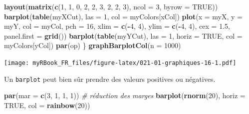 \documentclass[
]{book}
\newenvironment{Shaded}{\begin{snugshade}}{\end{snugshade}}
\newcommand{\CommentTok}[1]{\textcolor[rgb]{0.56,0.35,0.01}{\textit{#1}}}
\newcommand{\DataTypeTok}[1]{\textcolor[rgb]{0.13,0.29,0.53}{#1}}
\newcommand{\DecValTok}[1]{\textcolor[rgb]{0.00,0.00,0.81}{#1}}
\newcommand{\FloatTok}[1]{\textcolor[rgb]{0.00,0.00,0.81}{#1}}
\newcommand{\KeywordTok}[1]{\textcolor[rgb]{0.13,0.29,0.53}{\textbf{#1}}}
\newcommand{\NormalTok}[1]{#1}
\newcommand{\OperatorTok}[1]{\textcolor[rgb]{0.81,0.36,0.00}{\textbf{#1}}}
\newcommand{\OtherTok}[1]{\textcolor[rgb]{0.56,0.35,0.01}{#1}}
\begin{document}
\begin{Shaded}
\begin{Highlighting}[]
  \KeywordTok{layout}\NormalTok{(}\KeywordTok{matrix}\NormalTok{(}\KeywordTok{c}\NormalTok{(}\DecValTok{1}\NormalTok{, }\DecValTok{1}\NormalTok{, }\DecValTok{0}\NormalTok{, }
                  \DecValTok{2}\NormalTok{, }\DecValTok{2}\NormalTok{, }\DecValTok{3}\NormalTok{, }
                  \DecValTok{2}\NormalTok{, }\DecValTok{2}\NormalTok{, }\DecValTok{3}\NormalTok{), }\DataTypeTok{ncol =} \DecValTok{3}\NormalTok{, }\DataTypeTok{byrow =} \OtherTok{TRUE}\NormalTok{))}
  \KeywordTok{barplot}\NormalTok{(}\KeywordTok{table}\NormalTok{(myXCut), }\DataTypeTok{las =} \DecValTok{1}\NormalTok{, }\DataTypeTok{col =}\NormalTok{ myColors[xCol])}
  \KeywordTok{plot}\NormalTok{(}\DataTypeTok{x =}\NormalTok{ myX, }\DataTypeTok{y =}\NormalTok{ myY, }\DataTypeTok{col =}\NormalTok{ myCol, }\DataTypeTok{pch =} \DecValTok{16}\NormalTok{, }
    \DataTypeTok{xlim =} \KeywordTok{c}\NormalTok{(}\OperatorTok{-}\DecValTok{4}\NormalTok{, }\DecValTok{4}\NormalTok{), }\DataTypeTok{ylim =} \KeywordTok{c}\NormalTok{(}\OperatorTok{-}\DecValTok{4}\NormalTok{, }\DecValTok{4}\NormalTok{), }\DataTypeTok{cex =} \FloatTok{1.5}\NormalTok{, }
    \DataTypeTok{panel.first =} \KeywordTok{grid}\NormalTok{())}
  \KeywordTok{barplot}\NormalTok{(}\KeywordTok{table}\NormalTok{(myYCut), }\DataTypeTok{las =} \DecValTok{1}\NormalTok{, }\DataTypeTok{horiz =} \OtherTok{TRUE}\NormalTok{, }\DataTypeTok{col =}\NormalTok{ myColors[yCol])}
  \KeywordTok{par}\NormalTok{(op)}
\NormalTok{\}}
\KeywordTok{graphBarplotCol}\NormalTok{(}\DataTypeTok{n =} \DecValTok{1000}\NormalTok{)}
\end{Highlighting}
\end{Shaded}

\texttt{[image: myRBook\_FR\_files/figure-latex/021-01-graphiques-16-1.pdf]}

Un \texttt{barplot} peut bien sûr prendre des valeurs positives ou négatives.

\begin{Shaded}
\begin{Highlighting}[]
\KeywordTok{par}\NormalTok{(}\DataTypeTok{mar =} \KeywordTok{c}\NormalTok{(}\DecValTok{3}\NormalTok{, }\DecValTok{1}\NormalTok{, }\DecValTok{1}\NormalTok{, }\DecValTok{1}\NormalTok{)) }\CommentTok{# réduction des marges}
\KeywordTok{barplot}\NormalTok{(}\KeywordTok{rnorm}\NormalTok{(}\DecValTok{20}\NormalTok{), }\DataTypeTok{horiz =} \OtherTok{TRUE}\NormalTok{, }\DataTypeTok{col =} \KeywordTok{rainbow}\NormalTok{(}\DecValTok{20}\NormalTok{))}
\end{Highlighting}
\end{Shaded}
\end{document}
